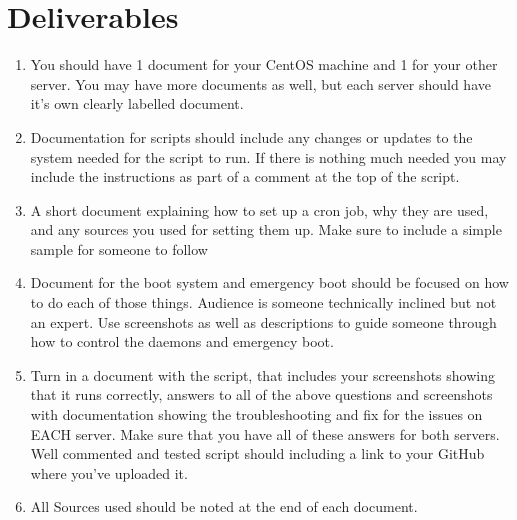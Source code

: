 \documentclass[12pt]{article}
\begin{document}
\section*{Deliverables}
\begin{enumerate}
    \item You should have 1 document for your CentOS machine and 1 for your other server.  You may have more documents as well, but each server should have it's own clearly labelled document. 
    \item  Documentation for scripts should include any changes or updates to the system needed for the script to run.  If there is nothing much needed you may include the instructions as part of a comment at the top of the script. 
    \item A short document explaining how to set up a cron job, why they are used, and any sources you used for setting them up. Make sure to include a simple sample for someone to follow
    \item Document for the boot system and emergency boot should be focused on how to do each of those things. Audience is someone technically inclined but not an expert.  Use screenshots as well as descriptions to guide someone through how to control the daemons and emergency boot.
    \item  Turn in a document with the script, that includes your screenshots showing that it runs correctly, answers to all of the above questions and screenshots with documentation showing the troubleshooting and fix for the issues on EACH server. Make sure that you have all of these answers for both servers. Well commented and tested script should including a link to your GitHub where you've uploaded it.
    \item All Sources used should be noted at the end of each document.  
\end{enumerate}
\end{document}
